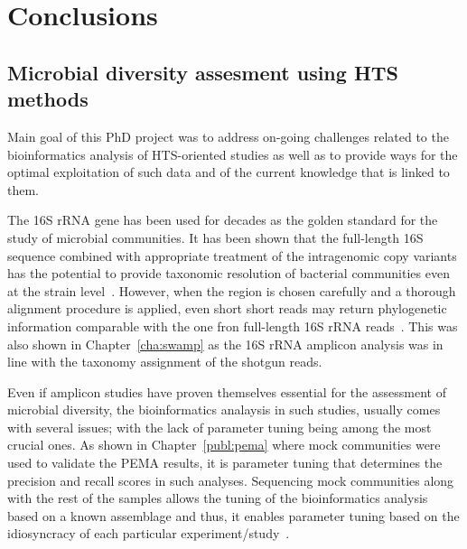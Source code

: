 % 
% 

\chapter{Conclusions}
\label{cha:conclusion}


\section{Microbial diversity assesment using HTS methods}
\label{chap:concl-diversity}

   Main goal of this PhD project was to address on-going challenges 
   related to the bioinformatics analysis of HTS-oriented studies 
   as well as 
   to provide ways for the optimal exploitation of such data and of 
   the current knowledge that is linked to them. 

   The 16S rRNA gene has been used for decades as the golden standard for the 
   study of microbial communities. 
   It has been shown that the
   full-length 16S sequence
   combined with appropriate treatment of the 
   intragenomic copy variants 
   has the potential to provide taxonomic resolution of 
   bacterial communities even at the strain level~\citep{johnson2019evaluation}.
   However, when the region is chosen carefully 
   and a thorough alignment procedure is applied,
   even short short reads may return phylogenetic information 
   comparable with the one fron full-length 16S rRNA reads~\citep{jeraldo2011suitability}.
   This was also shown in Chapter~\ref{cha:swamp} as the 16S rRNA amplicon analysis 
   was in line with the taxonomy assignment of the shotgun reads. 

   Even if amplicon studies have proven themselves essential for the assessment of 
   microbial diversity, the bioinformatics analaysis in such studies, 
   usually comes with several issues; 
   with the lack of parameter tuning being among the most crucial ones. 
   As shown in Chapter~\ref{publ:pema} where mock communities were used to validate the PEMA results,
   it is parameter tuning that determines the 
   precision and recall scores in such analyses. 
   Sequencing mock communities along with the rest of the samples   
   allows the tuning of the bioinformatics analysis based on a known assemblage
   and thus, it enables parameter tuning based on the idiosyncracy of each particular experiment/study~\citep{bokulich2020measuring}.

